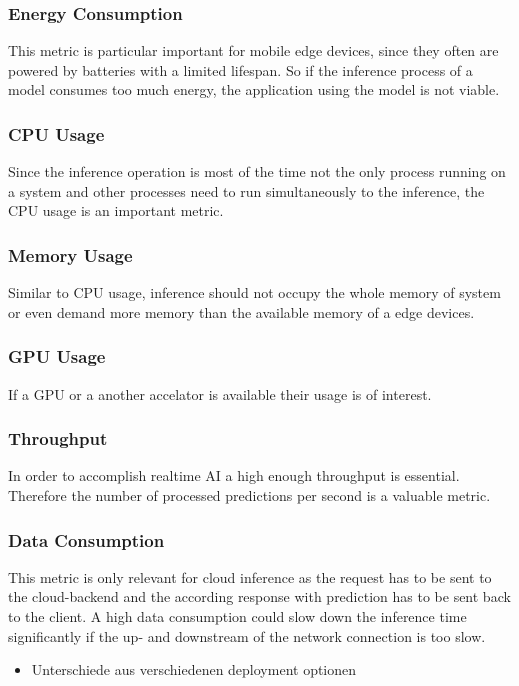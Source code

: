 \subsubsection{Energy Consumption}
This metric is particular important for mobile edge devices, since they often are powered by batteries with a limited lifespan. So if the inference process of a model consumes too much energy, the application using the model is not viable.
\subsubsection{CPU Usage}
Since the inference operation is most of the time not the only process running on a system and other processes need to run simultaneously to the inference, the CPU usage is an important metric.
\subsubsection{Memory Usage}
Similar to CPU usage, inference should not occupy the whole memory of system or even demand more memory than the available memory of a edge devices.
\subsubsection{GPU Usage}
If a GPU or a another accelator is available their usage is of interest.
\subsubsection{Throughput}
In order to accomplish realtime AI a high enough throughput is essential. Therefore the number of processed predictions per second is a valuable metric.
\subsubsection{Data Consumption}
This metric is only relevant for cloud inference as the request has to be sent to the cloud-backend and the according response with prediction has to be sent back to the client. A high data consumption could slow down the inference time significantly if the up- and downstream of the network connection is too slow. 
\begin{itemize}
    \item Unterschiede aus verschiedenen deployment optionen
\end{itemize}


\endinput 
